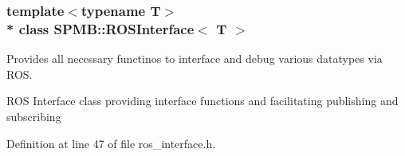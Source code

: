 \subsubsection*{template$<$typename T$>$\\*
class S\+P\+M\+B\+::\+R\+O\+S\+Interface$<$ T $>$}

Provides all necessary functinos to interface and debug various datatypes via R\+OS. 

R\+OS Interface class providing interface functions and facilitating publishing and subscribing 

Definition at line 47 of file ros\+\_\+interface.\+h.

